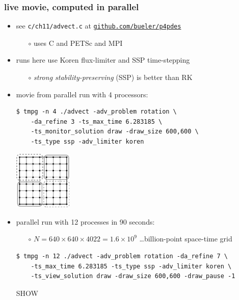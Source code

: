 \documentclass[10pt,dvipsnames,usepdftitle=false,
hyperref={pdftitle = {Finite volume methods},
    pdfauthor = {Ed Bueler}}]{beamer}
\begin{document}
\begin{frame}[fragile]
\frametitle{live movie, computed in parallel}

\begin{itemize}
\item see \texttt{c/ch11/advect.c} at \href{https://github.com/bueler/p4pdes}{\texttt{github.com/bueler/p4pdes}}
    \begin{itemize}
    \item[$\circ$] uses C and PETSc and MPI
    \end{itemize}
\item runs here use Koren flux-limiter and SSP time-stepping
    \begin{itemize}
    \item[$\circ$] \emph{strong stability-preserving} (SSP) is better than RK
    \end{itemize}
\item movie from parallel run with 4 processors:
\begin{Verbatim}[fontsize=\footnotesize]
$ tmpg -n 4 ./advect -adv_problem rotation \
    -da_refine 3 -ts_max_time 6.283185 \
    -ts_monitor_solution draw -draw_size 600,600 \
    -ts_type ssp -adv_limiter koren
\end{Verbatim}

\vspace{-20mm}
\hfill \includegraphics[width=0.22\textwidth]{figs/buelerfourproc}

\vspace{-1mm}
\item parallel run with 12 processes in 90 seconds:
    \begin{itemize}
    \item[$\circ$] $N=640\times 640 \times 4022 = 1.6 \times 10^9$ \dots billion-point space-time grid
    \end{itemize}
\begin{Verbatim}[fontsize=\footnotesize]
$ tmpg -n 12 ./advect -adv_problem rotation -da_refine 7 \
    -ts_max_time 6.283185 -ts_type ssp -adv_limiter koren \
    -ts_view_solution draw -draw_size 600,600 -draw_pause -1
\end{Verbatim}

\bigskip
\hspace{15mm} \alert{SHOW}
\end{itemize}
\end{frame}
\end{document}
